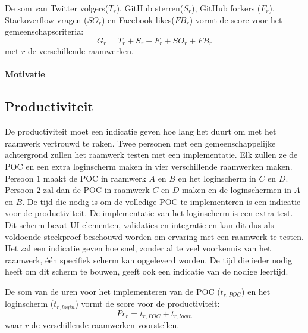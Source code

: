 De som van Twitter volgers($T_r$), GitHub sterren($S_r$), GitHub forkers ($F_r$), Stackoverflow vragen ($SO_r$) en Facebook likes($FB_r$) vormt de score voor het gemeenschapscriteria:
\begin{equation}
  G_r=T_r+S_r+F_r+SO_r+FB_r
  \label{eq:gemeenschap}
\end{equation}
met $r$ de verschillende raamwerken.

\paragraph{Motivatie}


\subsection{Productiviteit}
\label{sec:vergelijking-productiviteit}
De productiviteit moet een indicatie geven hoe lang het duurt om met het raamwerk vertrouwd te raken. 
Twee personen met een gemeenschappelijke achtergrond zullen het raamwerk testen met een implementatie.
Elk zullen ze de POC en een extra loginscherm maken in vier verschillende raamwerken maken.
Persoon $1$ maakt de POC in raamwerk $A$ en $B$ en het loginscherm in $C$ en $D$.
Persoon $2$ zal dan de POC in raamwerk $C$ en $D$ maken en de loginschermen in $A$ en $B$.
De tijd die nodig is om de volledige POC te implementeren is een indicatie voor de productiviteit. 
De implementatie van het loginscherm is een extra test.
Dit scherm bevat UI-elementen, validaties en  integratie en kan dit dus als voldoende steekproef beschouwd worden om ervaring met een raamwerk te testen.
Het zal een indicatie geven hoe snel,  zonder al te veel voorkennis van het raamwerk,  één specifiek scherm kan opgeleverd worden.
De tijd die ieder nodig heeft om dit scherm te bouwen, geeft ook een indicatie van de nodige leertijd.


De som van de uren voor het implementeren van de POC ($t_{r,POC}$) en het loginscherm ($t_{r,login}$) vormt de score voor de productiviteit:
\begin{equation}
  Pr_r = {t_{r,POC} + t_{r,login}}
  \label{eq:productiviteit}
\end{equation}
waar $r$ de verschillende raamwerken voorstellen.

